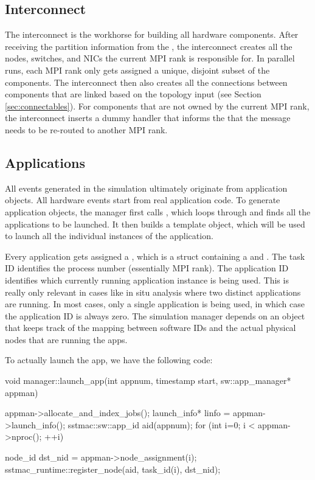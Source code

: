 \begin{enumerate}
\subsection{Interconnect}
The interconnect is the workhorse for building all hardware components.
After receiving the partition information from the ,
the interconnect creates all the nodes, switches, and NICs the current MPI rank is responsible for.
In parallel runs, each MPI rank only gets assigned a unique, disjoint subset of the components.
The interconnect then also creates all the connections between components that are linked based on the topology input (see Section \ref{sec:connectables}).
For components that are not owned by the current MPI rank, the interconnect inserts a dummy handler that informs the 
that the message needs to be re-routed to another MPI rank.

\subsection{Applications}
All events generated in the simulation ultimately originate from application objects.
All hardware events start from real application code.
To generate application objects,
the manager first calls , which loops through and finds all the applications to be launched.
It then builds a template object, which will be used to launch all the individual instances of the application.

Every application gets assigned a , which is a struct containing a  and .
The task ID identifies the process number (essentially MPI rank). 
The application ID identifies which currently running application instance is being used.
This is really only relevant in cases like in situ analysis where two distinct applications are running.
In most cases, only a single application is being used, in which case the application ID is always zero.
The simulation manager depends on an  object that keeps track of the mapping between software IDs and the actual physical nodes that are running the apps.

To actually launch the app, we have the following code:

\begin{CppCode}
void
manager::launch_app(int appnum, timestamp start, sw::app_manager* appman)
{
  appman->allocate_and_index_jobs();
  launch_info* linfo = appman->launch_info();
  sstmac::sw::app_id aid(appnum);
  for (int i=0; i < appman->nproc(); ++i) {
    node_id dst_nid = appman->node_assignment(i);
    sstmac_runtime::register_node(aid, task_id(i), dst_nid);

}}
\end{CppCode}
\end{enumerate}
